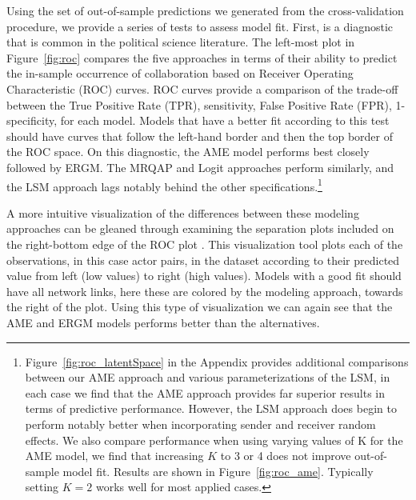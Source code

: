 Using the set of out-of-sample predictions we generated from the cross-validation procedure, we provide a series of tests to assess model fit. First, is a diagnostic that is common in the political science literature. The left-most plot in Figure~\ref{fig:roc} compares the five approaches in terms of their ability to predict the in-sample occurrence of collaboration based on Receiver Operating Characteristic (ROC) curves. ROC curves provide a comparison of the trade-off between the True Positive Rate (TPR), sensitivity, False Positive Rate (FPR), 1-specificity, for each model. Models that have a better fit according to this test should have curves that follow the left-hand border and then the top border of the ROC space. On this diagnostic, the AME model performs best closely followed by ERGM. The MRQAP and Logit approaches perform similarly, and the LSM approach lags notably behind the other specifications.\footnote{Figure~\ref{fig:roc_latentSpace} in the Appendix provides additional comparisons between our AME approach and various parameterizations of the LSM, in each case we find that the AME approach provides far superior results in terms of predictive performance. However, the LSM approach does begin to perform notably better when incorporating sender and receiver random effects. We also compare performance when using varying values of K for the AME model, we find that increasing $K$ to 3 or 4 does not improve out-of-sample model fit. Results are shown in Figure~\ref{fig:roc_ame}. Typically setting $K=2$ works well for most applied cases.} 

A more intuitive visualization of the differences between these modeling approaches can be gleaned through examining the separation plots included on the right-bottom edge of the ROC plot \citep{greenhill:etal:2011}. This visualization tool plots each of the observations, in this case actor pairs, in the dataset according to their predicted value from left (low values) to right (high values). Models with a good fit should have all network links, here these are colored by the modeling approach, towards the right of the plot. Using this type of visualization we can again see that the AME and ERGM models performs better than the alternatives.

